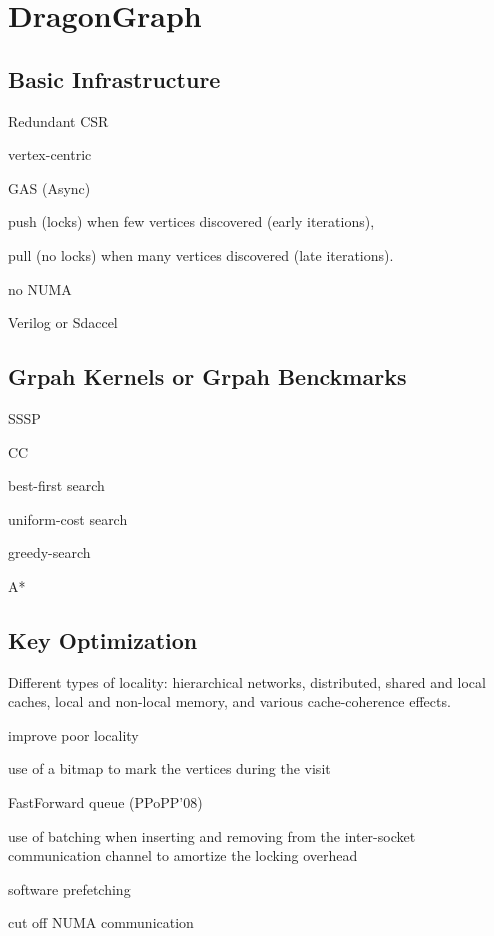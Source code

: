 \documentclass[UTF8,12pt,a4paper]{article}
\begin{document}
\section{DragonGraph}

\subsection{Basic Infrastructure}
\begin{compactitem}
  \item Redundant CSR
  \item vertex-centric
  \item GAS (Async)
  \item push (locks) when few vertices discovered (early iterations),
  \item pull (no locks) when many vertices discovered (late iterations).
  \item no NUMA
  \item Verilog or Sdaccel
\end{compactitem}

\subsection{Grpah Kernels or Grpah Benckmarks}
\begin{compactitem}
  \item SSSP
  \item CC
  \item best-first search
  \item uniform-cost search
  \item greedy-search
  \item A*
\end{compactitem}

\subsection{Key Optimization}
Different types of locality:
hierarchical networks, distributed,
shared and local caches, local and non-local memory,
and various cache-coherence effects.
\begin{compactitem}
  \item improve poor locality
  \item use of a bitmap to mark the vertices during the visit
  \item FastForward queue (PPoPP'08)
  \item use of batching when inserting and removing
  from the inter-socket communication channel to amortize the locking overhead
  \item software prefetching
  \item cut off NUMA communication
\end{compactitem}
\end{document}
